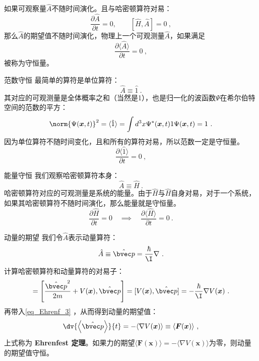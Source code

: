如果可观察量$\hat A$不随时间演化。且与哈密顿算符对易：
\begin{equation}
\frac{\partial \hat A}{\partial t}=0,\qquad[\hat H, \hat A]=0~,
\end{equation}
那么$\hat A$的期望值不随时间演化，物理上一个可观测量$\hat A$，如果满足
\begin{equation}
\frac{\partial\langle \hat A\rangle}{\partial t}=0~,
\end{equation}
被称为守恒量。
\begin{example}{范数守恒}
最简单的算符是单位算符：
\begin{equation}
\hat A\equiv \hat 1~.
\end{equation}
其对应的可观测量是全体概率之和（当然是1），也是归一化的波函数$\Psi$在希尔伯特空间的范数的平方：
\begin{equation}
\norm{\Psi(\boldsymbol{x}, t)}^2 = \langle\hat{1}\rangle=\int d^{3}x \Psi^{*}(\boldsymbol{x}, t) 1 \Psi(\boldsymbol{x}, t)=1~.
\end{equation}
因为单位算符不随时间变化，且和所有的算符对易，所以范数一定是守恒量。
\begin{equation}
\frac{\partial\langle \hat 1\rangle}{\partial t}=0~,
\end{equation}
\end{example}
\begin{example}{能量守恒}
我们观察哈密顿算符本身：
\begin{equation}
\hat A\equiv \hat H~.
\end{equation}
哈密顿算符对应的可观测量是系统的能量。由于$\hat H$与$\hat H$自身对易，对于一个系统，如果其哈密顿算符不随时间演化，那么能量就是守恒量。
\begin{equation}
\frac{\partial \hat H}{\partial t}=0 \quad\implies\quad \frac{\partial\langle \hat H\rangle}{\partial t}=0~.
\end{equation}
\end{example}
\begin{example}{动量的期望}
我们令$\hat A$表示动量算符：
\begin{equation}
\hat A \equiv \hat{\bvec p} = \frac{\hbar}{\I} \nabla~.
\end{equation}
计算哈密顿算符和动量算符的对易子：
\begin{equation}
[\hat H, \hat{\bvec p}]=\left[\frac{\hat{\bvec p}^2}{2 m}+V(\boldsymbol{x}), \hat{\bvec p}\right]=[V(\boldsymbol{x}), \hat{\bvec p}]=-\frac{\hbar}{\I} \nabla V(\boldsymbol{x})~.
\end{equation}
再带入\autoref{eq_Ehrenf_3} ，从而得到动量的期望值：
\begin{equation}\label{eq_Ehrenf_1}
\dv{\left \langle  \hat{\bvec p} \right\rangle}{t}=-\langle\nabla V(\boldsymbol{x})\rangle \equiv\langle\boldsymbol{F}(\boldsymbol{x})\rangle~,
\end{equation}
上式称为\textbf{ Ehrenfest 定理}。如果力的期望$\langle\boldsymbol{F}(\boldsymbol{x})\rangle=-\langle\nabla V(\boldsymbol{x})\rangle$为零，则动量的期望值守恒。
\end{example}

